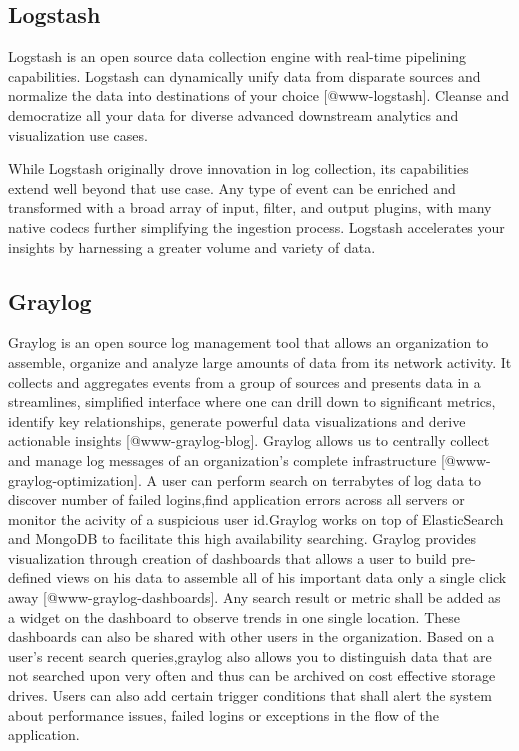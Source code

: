 \subsection{Logstash}

Logstash is an open source data collection engine with real-time
pipelining capabilities. Logstash can dynamically unify data from
disparate sources and normalize the data into destinations of your
choice [@www-logstash]. Cleanse and democratize all your data for
diverse advanced downstream analytics and visualization use cases.

While Logstash originally drove innovation in log collection, its
capabilities extend well beyond that use case. Any type of event can
be enriched and transformed with a broad array of input, filter, and
output plugins, with many native codecs further simplifying the
ingestion process. Logstash accelerates your insights by harnessing a
greater volume and variety of data.
  
\subsection{Graylog}

Graylog is an open source log management tool that allows an
organization to assemble, organize and analyze large amounts of data
from its network activity. It collects and aggregates events from a
group of sources and presents data in a streamlines, simplified
interface where one can drill down to significant metrics, identify
key relationships, generate powerful data visualizations and derive
actionable insights [@www-graylog-blog].  Graylog allows us to
centrally collect and manage log messages of an organization's
complete infrastructure [@www-graylog-optimization]. A user can
perform search on terrabytes of log data to discover number of failed
logins,find application errors across all servers or monitor the
acivity of a suspicious user id.Graylog works on top of ElasticSearch
and MongoDB to facilitate this high availability searching.  Graylog
provides visualization through creation of dashboards that allows a
user to build pre-defined views on his data to assemble all of his
important data only a single click away
[@www-graylog-dashboards]. Any search result or metric shall be
added as a widget on the dashboard to observe trends in one single
location. These dashboards can also be shared with other users in the
organization. Based on a user's recent search queries,graylog also
allows you to distinguish data that are not searched upon very often
and thus can be archived on cost effective storage drives. Users can
also add certain trigger conditions that shall alert the system about
performance issues, failed logins or exceptions in the flow of the
application.
    
